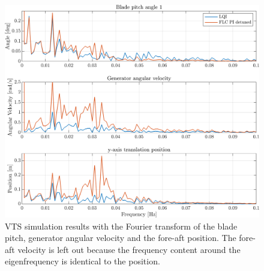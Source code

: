 \clearpage

\begin{figure}[h]
	\centering
	\includegraphics[width=0.7\linewidth]{Graphics/TestResults/VTSplotting/11_fft_th_w_py.png}
	\caption{VTS simulation results with the Fourier transform of the blade pitch, generator angular velocity and the fore-aft position. The fore-aft velocity is left out because the frequency content around the eigenfrequency is identical to the position.}
	\label{fig:vts_11_fft_th_w_py_vy}
\end{figure}

